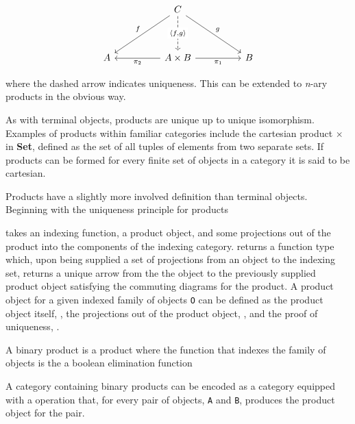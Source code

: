 \[\begin{tikzcd}[sep=huge]
 & C \arrow[ld, "f"'] \arrow[rd, "g"] \arrow[d, "{\langle f, g\rangle}" description, dashed] &  \\
A & A \times B \arrow[l, "\pi_2"] \arrow[r, "\pi_1"'] & B
\end{tikzcd}\]

where the dashed arrow indicates uniqueness. This can be extended to
\textit{n}-ary products in the obvious way.

As with terminal objects, products are unique up to unique isomorphism. Examples
of products within familiar categories include the cartesian product $\times$ in
\textbf{Set}, defined as the set of all tuples of elements from two separate
sets. If products can be formed for every finite set of objects in a category it
is said to be cartesian.

Products have a slightly more involved definition than terminal objects. Beginning
with the uniqueness principle for products


 takes an indexing function, a product object, and some
projections out of the product into the components of the indexing category.
 returns a function type which, upon being supplied a
set of projections from an object to the indexing set, returns a unique arrow
from the the object to the previously supplied product object satisfying the
commuting diagrams for the product. A product object for a given indexed family
of objects \verb|O| can be defined as the product object itself,
, the projections out of the product object, ,
and the proof of uniqueness, .


A binary product is a product where the function that indexes the family of
objects is the a boolean elimination function


A category containing binary products can be encoded as a category equipped with
a operation that, for every pair of objects, \verb|A| and \verb|B|, produces the
product object for the pair.

